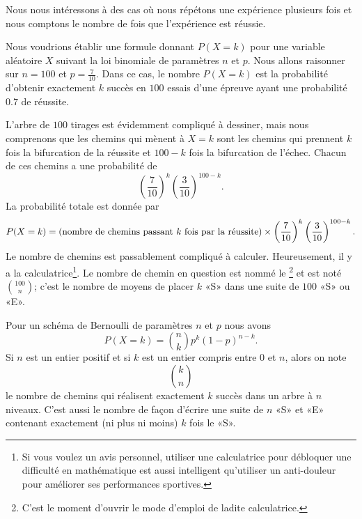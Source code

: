 \begin{Enmini}
    Nous nous intéressons à des cas où nous répétons une expérience plusieurs fois et nous comptons le nombre de fois que l'expérience est réussie.
\end{Enmini}

Nous voudrions établir une formule donnant \( P(X=k)\) pour une variable aléatoire \( X\) suivant la loi binomiale de paramètres \( n\) et \( p\). Nous allons raisonner sur \( n=100\) et \( p=\frac{ 7 }{ 10 }\). Dans ce cas, le nombre \( P(X=k)\) est la probabilité d'obtenir exactement \( k\) succès en \( 100\) essais d'une épreuve ayant une probabilité \( 0.7\) de réussite.

L'arbre de \( 100\) tirages est évidemment compliqué à dessiner, mais nous comprenons que les chemins qui mènent à \( X=k\) sont les chemins qui prennent \( k\) fois la bifurcation de la réussite et \( 100-k\) fois la bifurcation de l'échec. Chacun de ces chemins a une probabilité de
\begin{equation}
    \left( \frac{ 7 }{ 10 } \right)^{k}\left( \frac{ 3 }{ 10 } \right)^{100-k}.
\end{equation}
La probabilité totale est donnée par
\begin{equation}
    P(X=k)=(\text{nombre de chemins passant \( k\) fois par la réussite})\times \left( \frac{ 7 }{ 10 } \right)^k\left( \frac{ 3 }{ 10 } \right)^{100-k}.
\end{equation}
Le nombre de chemins est passablement compliqué à calculer. Heureusement, il y a la calculatrice\footnote{Si vous voulez un avis personnel, utiliser une calculatrice pour débloquer une difficulté en mathématique est aussi intelligent qu'utiliser un anti-douleur pour améliorer ses performances sportives.}. Le nombre de chemin en question est nommé le \footnote{C'est le moment d'ouvrir le mode d'emploi de ladite calculatrice.} et est noté \( {100\choose n}\); c'est le nombre de moyens de placer \( k\) «S» dans une suite de \( 100\) «S» ou «E».

\begin{Aretenir}
    Pour un schéma de Bernoulli de paramètres \( n\) et \( p\) nous avons
    \begin{equation}
        P(X=k)={n\choose k}p^{k}(1-p)^{n-k}.
    \end{equation}
    Si \( n\) est un entier positif et si \( k\) est un entier compris entre \( 0\) et \( n\), alors on note
    \[
        {k\choose n}
    \]
    le nombre de chemins qui réalisent exactement \( k\) succès dans un arbre à \( n\) niveaux. C'est aussi le nombre de façon d'écrire une suite de \( n\) «S» et «E» contenant exactement (ni plus ni moins) \( k\) fois le «S».
\end{Aretenir}

